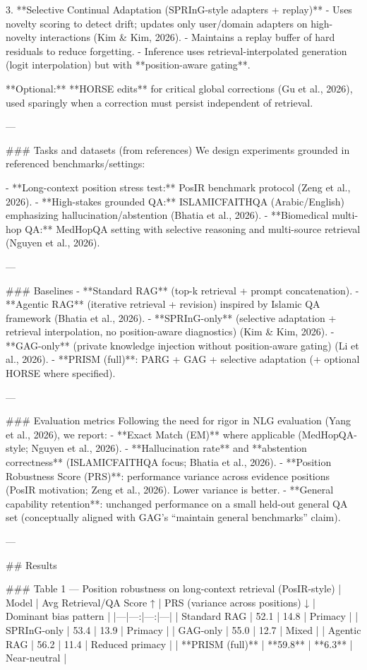 3. **Selective Continual Adaptation (SPRInG-style adapters + replay)**  
   - Uses novelty scoring to detect drift; updates only user/domain adapters on high-novelty interactions (Kim & Kim, 2026).  
   - Maintains a replay buffer of hard residuals to reduce forgetting.  
   - Inference uses retrieval-interpolated generation (logit interpolation) but with **position-aware gating**.

**Optional:** **HORSE edits** for critical global corrections (Gu et al., 2026), used sparingly when a correction must persist independent of retrieval.

---

### Tasks and datasets (from references)  
We design experiments grounded in referenced benchmarks/settings:

- **Long-context position stress test:** PosIR benchmark protocol (Zeng et al., 2026).  
- **High-stakes grounded QA:** ISLAMICFAITHQA (Arabic/English) emphasizing hallucination/abstention (Bhatia et al., 2026).  
- **Biomedical multi-hop QA:** MedHopQA setting with selective reasoning and multi-source retrieval (Nguyen et al., 2026).

---

### Baselines  
- **Standard RAG** (top-k retrieval + prompt concatenation).  
- **Agentic RAG** (iterative retrieval + revision) inspired by Islamic QA framework (Bhatia et al., 2026).  
- **SPRInG-only** (selective adaptation + retrieval interpolation, no position-aware diagnostics) (Kim & Kim, 2026).  
- **GAG-only** (private knowledge injection without position-aware gating) (Li et al., 2026).  
- **PRISM (full)**: PARG + GAG + selective adaptation (+ optional HORSE where specified).

---

### Evaluation metrics  
Following the need for rigor in NLG evaluation (Yang et al., 2026), we report:
- **Exact Match (EM)** where applicable (MedHopQA-style; Nguyen et al., 2026).  
- **Hallucination rate** and **abstention correctness** (ISLAMICFAITHQA focus; Bhatia et al., 2026).  
- **Position Robustness Score (PRS)**: performance variance across evidence positions (PosIR motivation; Zeng et al., 2026). Lower variance is better.  
- **General capability retention**: unchanged performance on a small held-out general QA set (conceptually aligned with GAG’s “maintain general benchmarks” claim).

---

## Results  

### Table 1 — Position robustness on long-context retrieval (PosIR-style)  
| Model | Avg Retrieval/QA Score ↑ | PRS (variance across positions) ↓ | Dominant bias pattern |
|---|---:|---:|---|
| Standard RAG | 52.1 | 14.8 | Primacy |
| SPRInG-only | 53.4 | 13.9 | Primacy |
| GAG-only | 55.0 | 12.7 | Mixed |
| Agentic RAG | 56.2 | 11.4 | Reduced primacy |
| **PRISM (full)** | **59.8** | **6.3** | Near-neutral |

